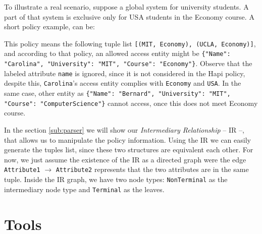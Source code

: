 \documentclass[sigplan,screen,anonymous,review]{acmart}\settopmatter{printfolios=true,printccs=false,printacmref=false}
\begin{document}
To illustrate a real scenario, suppose a global system for university students.
A part of that system is exclusive only for USA students in the Economy course.
A short policy example, can be:


This policy means the following tuple list
\texttt{[(MIT, Economy), (UCLA, Economy)]}, and according to that policy, an
allowed access entity might be \texttt{\{"Name": "Carolina", "University":
"MIT", "Course": "Economy"\}}.
Observe that the labeled attribute \texttt{name} is ignored, since it is not
considered in the Hapi policy, despite this, \texttt{Carolina}'s access entity
complies with \texttt{Economy} and \texttt{USA}.
In the same case, other entity as \texttt{\{"Name": "Bernard", "University":
"MIT", "Course": "ComputerScience"\}} cannot access, once this does not meet
Economy course.


In the section \ref{sub:parser} we will show our \textit{Intermediary
Relationship} -- IR --, that allows us to manipulate the policy information.
Using the IR we can easily generate the tuples list, since these two structures are
equivalent each other.
For now, we just assume the existence of the IR as a directed graph were
the edge \texttt{Attribute1} $\rightarrow$ \texttt{Attribute2} represents that
the two attributes are in the same tuple.
Inside the IR graph, we have two node types: \texttt{NonTerminal} as the
intermediary node type and \texttt{Terminal} as the leaves.



\section{Tools}
\label{sec:tools}
\end{document}
